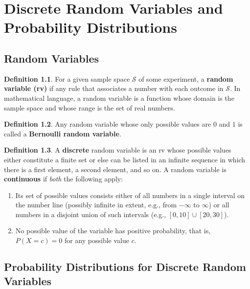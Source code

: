 \documentclass[a4paper]{report}
\theoremstyle{definition}
\newtheorem{definition}{Definition}
\theoremstyle{plain}
\begin{document}
\chapter{Discrete Random Variables and Probability Distributions}

\section{Random Variables}

\begin{definition}
  For a given sample space $\mathcal{S}$ of some experiment, a
  \textbf{random variable (rv)} if any rule that associates a number
  with each outcome in $\mathcal{S}$. In mathematical language, a random
  variable is a function whose domain is the sample space and whose
  range is the set of real numbers.
\end{definition}

\begin{definition}
  Any random variable whose only possible values are $0$ and $1$ is
  called a \textbf{Bernoulli random variable}.
\end{definition}

\begin{definition}
  A \textbf{discrete} random variable is an rv whose possible values
  either constitute a finite set or else can be listed in an infinite
  sequence in which there is a first element, a second element, and so
  on. A random variable is \textbf{continuous} if \textit{both} the
  following apply: 

  \begin{enumerate}
    \item Its set of possible values consists either of all numbers in
    a single interval on the number line (possibly infinite in extent,
    e.g., from $-\infty$ to $\infty$) or all numbers in a disjoint union
    of such intervals (e.g., $\left[ 0, 10 \right]\cup \left[ 20, 30
    \right]$).
    \item No possible value of the variable has positive probability,
    that is, \\
    $P(X = c) = 0$ for any possible value $c$.
  \end{enumerate}
\end{definition}

\section{Probability Distributions for Discrete Random Variables}
\end{document}
